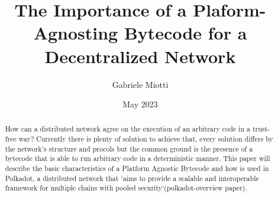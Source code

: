 \documentclass{article}
\title{The Importance of a Plaform-Agnosting Bytecode for a Decentralized Network}
\author{Gabriele Miotti}
\date{May 2023}
\begin{document}
\maketitle

\begin{abstract}

How can a distributed network agree on the execution of an arbitrary code in a trust-free way? Currently there is plenty of solution to achieve that, every solution differs by the network's structure and procols but the common ground is the presence of a bytecode that is able to run arbitrary code in a deterministic manner. This paper will describe the basic characteristics of a Platform Agnostic Bytecode and how is used in Polkadot, a distributed network that `aims to provide a scalable and interoperable framework for multiple chains with pooled security`(polkadot-overview paper).

\end{abstract}

{
  \hypersetup{linkcolor=black}
  \tableofcontents
}












\end{document}
